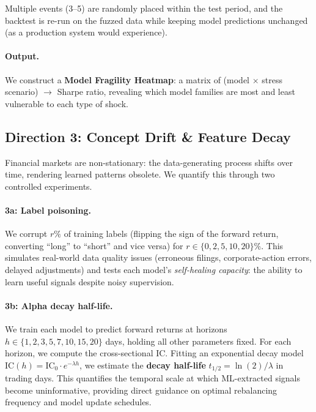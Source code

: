 \documentclass[preprint,review,12pt]{elsarticle}
\begin{document}
Multiple events (3--5) are randomly placed within the test period, and the backtest is re-run on the fuzzed data while keeping model predictions unchanged (as a production system would experience).

\paragraph{Output.}
We construct a \textbf{Model Fragility Heatmap}: a matrix of (model $\times$ stress scenario) $\to$ Sharpe ratio, revealing which model families are most and least vulnerable to each type of shock.

\subsection{Direction 3: Concept Drift \& Feature Decay}
\label{sec:drift_method}

Financial markets are non-stationary: the data-generating process shifts over time, rendering learned patterns obsolete.
We quantify this through two controlled experiments.

\paragraph{3a: Label poisoning.}
We corrupt $r\%$ of training labels (flipping the sign of the forward return, converting ``long'' to ``short'' and vice versa) for $r \in \{0, 2, 5, 10, 20\}\%$.
This simulates real-world data quality issues (erroneous filings, corporate-action errors, delayed adjustments) and tests each model's \emph{self-healing capacity}: the ability to learn useful signals despite noisy supervision.

\paragraph{3b: Alpha decay half-life.}
We train each model to predict forward returns at horizons $h \in \{1, 2, 3, 5, 7, 10, 15, 20\}$ days, holding all other parameters fixed.
For each horizon, we compute the cross-sectional IC.
Fitting an exponential decay model $\text{IC}(h) = \text{IC}_0 \cdot e^{-\lambda h}$, we estimate the \textbf{decay half-life} $t_{1/2} = \ln(2)/\lambda$ in trading days.
This quantifies the temporal scale at which ML-extracted signals become uninformative, providing direct guidance on optimal rebalancing frequency and model update schedules.


\end{document}
